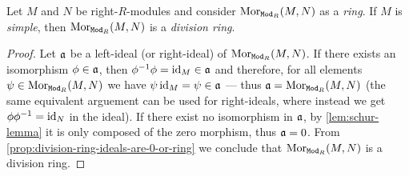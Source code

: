\begin{corollary}
\label{cor:M-simple-Mor-division-ring}
Let \(M\) and \(N\) be right-\(R\)-modules and consider
\(\operatorname{Mor}_{{\texttt{Mod}_{R}}}(M, N)\) as a \emph{ring}. If \(M\) is \emph{simple}, then
\(\operatorname{Mor}_{{\texttt{Mod}_{R}}}(M, N)\) is a \emph{division ring}.
\end{corollary}

\begin{proof}
Let \(\mathfrak{a}\) be a left-ideal (or right-ideal) of \(\operatorname{Mor}_{{\texttt{Mod}_{R}}}(M,
N)\). If there exists an isomorphism \(\phi \in \mathfrak{a}\), then
\(\phi^{-1} \phi = \operatorname{id}_M \in \mathfrak{a}\) and therefore, for all elements
\(\psi \in \operatorname{Mor}_{{\texttt{Mod}_{R}}}(M, N)\) we have \(\psi \operatorname{id}_M = \psi \in \mathfrak{a}\)
--- thus \(\mathfrak{a} = \operatorname{Mor}_{{\texttt{Mod}_{R}}}(M, N)\) (the same equivalent arguement can
be used for right-ideals, where instead we get \(\phi \phi^{-1} = \operatorname{id}_N\) in the
ideal). If there exist no isomorphism in \(\mathfrak{a}\), by
\cref{lem:schur-lemma} it is only composed of the zero morphism, thus
\(\mathfrak{a} = 0\). From \cref{prop:division-ring-ideals-are-0-or-ring} we
conclude that \(\operatorname{Mor}_{{\texttt{Mod}_{R}}}(M, N)\) is a division ring.
\end{proof}

